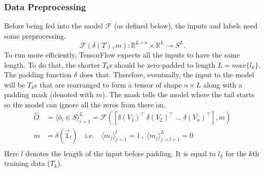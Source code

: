 \subsubsection{Data Preprocessing}
Before being fed into the model $\mathcal{F}$ (as defined below), the inputs and labels need some preprocessing. 
\begin{equation}\label{eq:model_F}
    \mathcal{F}(\delta(T), m) \colon \mathbb{R}^{L\times n}\times\mathbb{R}^L\to S^{L}.
\end{equation}
To run more efficiently, TensorFlow expects all the inputs to have the same length. To do that, the shorter $T_k$s should be zero-padded to length $L = max\{l_k\}$. The padding function $\delta$ does that.
Therefore, eventually, the input to the model will be $T_k$s that are rearranged to form a tensor of shape $n \times L$ along with a padding mask (denoted with $m$). 
The mask tells the model where the tail starts so the model can ignore all the zeros from there on. %
\begin{equation}\label{eq:model_as_function}
\begin{split}
    \hat{O} {}&{}= \langle \hat{o}_i \in S \rangle^L_{i=1} = \mathcal{F}\left(\left[ {\delta(V_1)}^\intercal \: {\delta(V_2)}^\intercal \; \ldots \; {\delta(V_n)}^\intercal \right],m\right) \\
    m {}&{}= \delta(\vec{\mathds{1}}_l) \quad\text{i.e.}\quad \langle {m}_j \rangle^l_{j=1} = 1\:, \: \langle {m}_j \rangle^L_{j=l+1} = 0 \\
\end{split}
\end{equation}
Here $l$ denotes the length of the input before padding. It is equal to $l_k$ for the $k$th training data ($T_k$).


